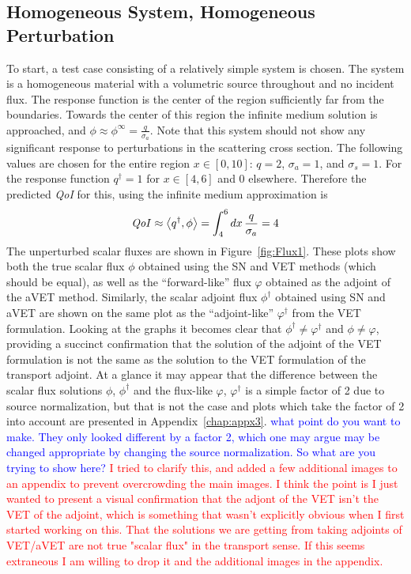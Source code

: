 \documentclass[12pt]{report}
\newcommand{\bra}{\left\langle}
\newcommand{\ket}{\right\rangle}
\newcommand{\sigs}{\sigma_s}
\newcommand{\siga}{\sigma_a}
\newcommand{\qoi}{{\it QoI}\xspace}
\newcommand{\comment}[2]{\marginpar{\textcolor{#2}{$\star$}}\textcolor{#2}{#1}\newline}
\newcommand{\iwh}[1]{\comment{#1}{red}}
\newcommand{\jcr}[1]{\comment{#1}{blue}}
\newcommand{\iwh}[1]{\phantom{a}}
\newcommand{\jcr}[1]{\phantom{a}}
\begin{document}
\subsection{Homogeneous System, Homogeneous Perturbation}
To start, a test case consisting of a relatively simple system is chosen. The system is a homogeneous material with a volumetric source throughout and no incident flux. The response function is the center of the region sufficiently far from the boundaries. Towards the center of this region the infinite medium solution is approached, and $\phi \approx \phi^\infty = \frac{q}{\siga}$. Note that this system should not show any significant response to perturbations in the scattering cross section. The following values are chosen for the entire region $x \in [0,10]$: $q=2$, $\siga=1$, and $\sigs=1$. For the response function $q^\dag=1$ for $x\in[4,6]$ and $0$ elsewhere. Therefore the predicted \qoi for this, using the infinite medium approximation is
\begin{equation}
\qoi \approx \bra q^\dag , \phi \ket = \int_4^6 dx \, \frac{q}{\siga} = 4
\end{equation}
The unperturbed scalar fluxes are shown in Figure~\ref{fig:Flux1}. These plots show both the true scalar flux $\phi$ obtained using the SN and VET methods (which should be equal), as well as the ``forward-like'' flux $\varphi$ obtained as the adjoint of the aVET method. Similarly, the scalar adjoint flux $\phi^\dag$ obtained using SN and aVET are shown on the same plot as the ``adjoint-like'' $\varphi^\dag$ from the VET formulation. Looking at the graphs it becomes clear that $\phi^\dag \neq \varphi^\dag$ and $\phi \neq \varphi$, providing a succinct confirmation that the solution of the adjoint of the VET formulation is not the same as the solution to the VET formulation of the transport adjoint. At a glance it may appear that the difference between the scalar flux solutions $\phi$, $\phi^\dag$ and the flux-like $\varphi$, $\varphi^\dag$ is a simple factor of 2 due to source normalization, but that is not the case and plots which take the factor of 2 into account are presented in Appendix~\ref{chap:appx3}.
\jcr{what point do you want to make. They only looked different by a factor 2, which one may argue may be changed appropriate by changing the source normalization. So what are you trying to show here?}
\iwh{I tried to clarify this, and added a few additional images to an appendix to prevent overcrowding the main images. I think the point is I just wanted to present a visual confirmation that the adjont of the VET isn't the VET of the adjoint, which is something that wasn't explicitly obvious when I first started working on this. That the solutions we are getting from taking adjoints of VET/aVET are not true "scalar flux" in the transport sense. If this seems extraneous I am willing to drop it and the additional images in the appendix.}
\end{document}

